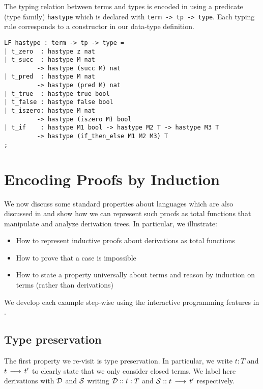 The typing relation between terms and types is encoded in \beluga using a
predicate (type family) \lstinline!hastype! which is declared with
\lstinline!term -> tp -> type!. Each typing rule corresponds to a constructor in
our data-type definition. 

\begin{lstlisting}
LF hastype : term -> tp -> type =
| t_zero  : hastype z nat
| t_succ  : hastype M nat
         -> hastype (succ M) nat
| t_pred  : hastype M nat
         -> hastype (pred M) nat
| t_true  : hastype true bool
| t_false : hastype false bool
| t_iszero: hastype M nat
         -> hastype (iszero M) bool
| t_if    : hastype M1 bool -> hastype M2 T -> hastype M3 T
         -> hastype (if_then_else M1 M2 M3) T
;
\end{lstlisting} 


\chapter{Encoding Proofs by Induction}\label{chap:proofs-basic}

We now discuss some standard properties about languages which are also discussed
in \cite{TAPL} and show how we can represent such proofs as total functions that
manipulate and analyze derivation trees. In particular, we illustrate:

\begin{itemize}
\item How to represent inductive proofs about derivations  as total functions 
\item How to prove that a case is impossible
\item How to state a property universally about terms and reason by induction on
  terms (rather than derivations)
\end{itemize}

We develop each example step-wise using the interactive programming features in \beluga.

\section{Type preservation} The first property we re-visit is type
preservation. In particular, we write $t : T$ and $t \Steps t'$ to
clearly state that we only consider closed terms. We label here
derivations with $\D$ and $\S$ writing $\proofderiv{\D}{t:T}$ and
$\proofderiv{\S}{t \Steps t'}$ respectively.

